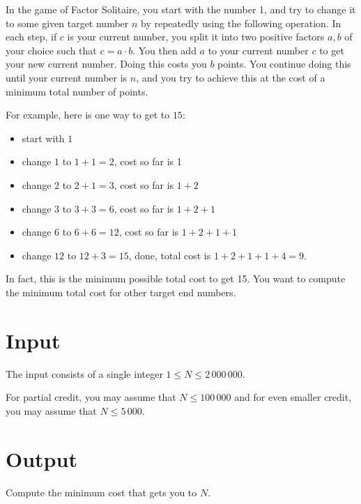 In the game of Factor Solitaire, you start with the number 1, and try to change it to some given
target number $n$ by repeatedly using the following operation. In each step, if $c$ is your current
number, you split it into two positive factors $a, b$ of your choice such that $c = a \cdot b$. You
then add $a$ to your current number $c$ to get your new current number. Doing this costs you $b$ points.
You continue doing this until your current number is $n$, and you try to achieve this at the cost of
a minimum total number of points.

For example, here is one way to get to $15$:
\begin{itemize}
\item start with $1$
\item change $1$ to $1+1 = 2$, cost so far is 1
\item change $2$ to $2+1 = 3$, cost so far is $1+2$
\item change $3$ to $3+3 = 6$, cost so far is $1+2+1$
\item change $6$ to $6+6 = 12$, cost so far is $1+2+1+1$
\item change $12$ to $12+3 = 15$, done, total cost is $1+2+1+1+4=9$.
\end{itemize}

In fact, this is the minimum possible total cost to get 15. You want to compute the minimum total
cost for other target end numbers.

\section*{Input}
The input consists of a single integer $1 \le N \le 2\,000\,000$.

For partial credit, you may assume that $N \le 100\,000$ and for even smaller credit, you may
assume that $N \le 5\,000$.


\section*{Output}
Compute the minimum cost that gets you to $N$.
